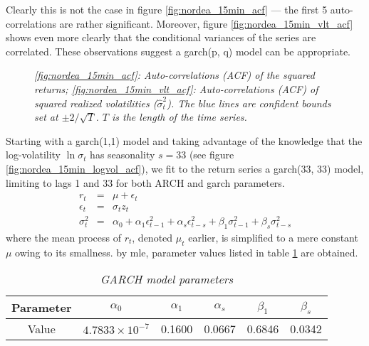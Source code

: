 Clearly this is not the case in figure \ref{fig:nordea_15min_acf} ---
the first 5 auto-correlations are rather significant. Moreover, figure
\ref{fig:nordea_15min_vlt_acf} shows even more clearly that the
conditional variances of the series are correlated. These observations
suggest a \gls{garch}(p, q) model can be appropriate.
\begin{figure}[htb!]
  \centering
  \caption{\small \it \ref{fig:nordea_15min_acf}: Auto-correlations
    (ACF) of the squared returns; \ref{fig:nordea_15min_vlt_acf}:
    Auto-correlations (ACF) of squared realized volatilities
    ($\hat{\sigma}^2_t$). The blue lines are confident bounds set at
    $\pm 2/\sqrt{T}$. $T$ is the length of the time series.}
\end{figure}

Starting with a \gls{garch}(1,1) model and taking advantage of the knowledge
that the log-volatility $\ln \sigma_t$ has seasonality $s=33$ (see
figure \ref{fig:nordea_15min_logvol_acf}), we fit to the return series
a \gls{garch}(33, 33) model, limiting to lags 1 and 33 for both ARCH and
\gls{garch} parameters.
\begin{eqnarray*}
  r_t &=& \mu + \epsilon_t \\
  \epsilon_t &=& \sigma_t z_t \\
  \sigma^2_t &=& \alpha_0 + \alpha_1 \epsilon^2_{t-1} + \alpha_s
  \epsilon^2_{t-s} + \beta_1 \sigma^2_{t-1} + \beta_s \sigma^2_{t-s}
\end{eqnarray*}
where the mean process of $r_t$, denoted $\mu_t$ earlier, is simplified
to a mere constant $\mu$ owing to its smallness. by \gls{mle},
parameter values listed in table \ref{tab:nordea_15min_garch} are obtained.
\begin{table}[htb!]
  \centering
  \begin{tabular}{|c|c|c|c|c|c|}
    \hline
    Parameter & $\alpha_0$ & $\alpha_1$ & $\alpha_s$ & $\beta_1$ &
    $\beta_s$ \\
    \hline
    Value & $4.7833 \times 10^{-7}$ & 0.1600 & 0.0667 & 0.6846 &
    0.0342 \\
    \hline
  \end{tabular}
  \caption{\small \it GARCH model parameters}
  \label{tab:nordea_15min_garch}
\end{table}

